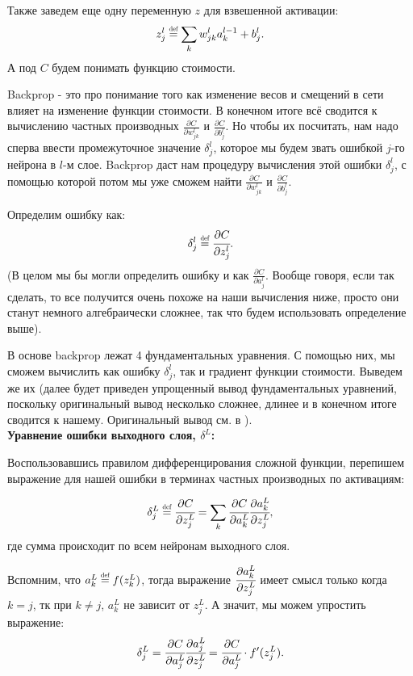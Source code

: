 Также заведем еще одну переменную $z$ для взвешенной активации:
\begin{equation*}
    z_j^l \defeq \sum_k w_{jk}^l a_k^{l-1} + b_j^l.
\end{equation*}
А под $C$ будем понимать функцию стоимости.

Backprop - это про понимание того как изменение весов и смещений в сети 
влияет на изменение функции стоимости. В конечном итоге всё сводится 
к вычислению частных производных $\frac{\partial C}{\partial w_{jk}^l}$ и 
$\frac{\partial C}{\partial b_j^l}$. Но чтобы их посчитать, нам надо 
сперва ввести промежуточное значение $\delta_j^l$, которое мы будем звать 
ошибкой $j$-го нейрона в $l$-м слое. Backprop даст нам процедуру вычисления этой 
ошибки $\delta_j^l$, с помощью которой потом мы уже сможем найти 
$\frac{\partial C}{\partial w_{jk}^l}$ и $\frac{\partial C}{\partial b_j^l}$.

Определим ошибку как:
\begin{equation*}
    \delta_j^l \defeq \cfrac{\partial C}{\partial z_j^l}.
\end{equation*}
(В целом мы бы могли определить ошибку и как $\frac{\partial C}{\partial a_j^l}$. 
Вообще говоря, если так сделать, то все получится очень похоже на наши вычисления 
ниже, просто они станут немного алгебраически сложнее, так что будем использовать 
определение выше).

В основе backprop лежат 4 фундаментальных уравнения. С помощью них, мы сможем 
вычислить как ошибку $\delta_j^l$, так и градиент функции стоимости. Выведем же их 
(далее будет приведен упрощенный вывод фундаментальных уравнений, поскольку 
оригинальный вывод несколько сложнее, длинее и в конечном итоге сводится к нашему. 
Оригинальный вывод см. в \cite{backprop}).\\

\noindent\textbf{Уравнение ошибки выходного слоя, $\delta^L$:}

Воспользовавшись правилом дифференцирования сложной функции, 
перепишем выражение для нашей ошибки в терминах частных производных 
по активациям:

\begin{equation*}
    \delta_j^L \defeq \cfrac{\partial C}{\partial z_j^L} = 
    \sum_k \cfrac{\partial C}{\partial a_k^L} \cfrac{\partial a_k^L}{\partial z_j^L}, 
\end{equation*}
где сумма происходит по всем нейронам выходного слоя. 

Вспомним, что $a_k^L \defeq f(z_k^L)$, тогда
выражение $\cfrac{\partial a_k^L}{\partial z_j^L}$ имеет смысл только когда $k=j$, 
тк при $k \neq j$, $a_k^L$ не зависит от $z_j^L$. А значит, мы можем упростить 
выражение:
\begin{equation*}
    \delta_j^L = \cfrac{\partial C}{\partial a_j^L} \cfrac{\partial a_j^L}{\partial z_j^L} 
    = \cfrac{\partial C}{\partial a_j^L} \cdot f'(z_j^L).
\end{equation*}

